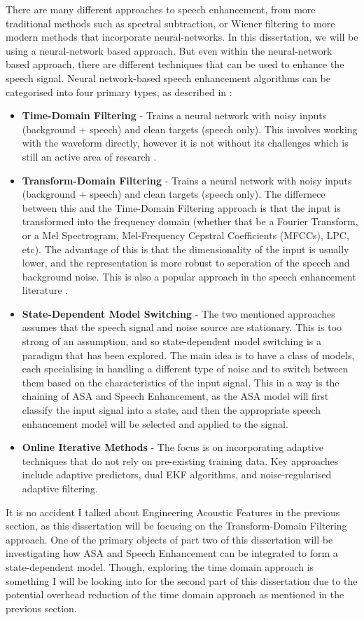 \documentclass[logo,bsc,singlespacing,parskip,online]{infthesis}
\begin{document}
There are many different approaches to speech enhancement, from more traditional methods such as spectral subtraction, or Wiener filtering
to more modern methods that incorporate neural-networks. In this dissertation, we will be using a neural-network based approach.
But even within the neural-network based approach, there are different techniques that can be used to enhance the speech signal. 
Neural network-based speech enhancement algorithms can be categorised into four primary types, as described in \cite{katagiri_handbook_2000}:
\begin{itemize}
   \item \textbf{Time-Domain Filtering} - Trains a neural network with noisy inputs (background + speech) and clean targets (speech only). 
   This involves working with the waveform directly, however it is not without its challenges which is still an active area of research \cite{saleem_time_2024}.
   \item \textbf{Transform-Domain Filtering} - Trains a neural network with noisy inputs (background + speech) and clean targets (speech only). 
   The differnece between this and the Time-Domain Filtering approach is that the input is transformed into the frequency domain 
   (whether that be a Fourier Transform, or a Mel Spectrogram, Mel-Frequency Cepstral Coefficients (MFCCs), LPC, etc). The advantage of this 
   is that the dimensionality of the input is usually lower, and the representation is more robust to seperation of the speech and background noise.
   This is also a popular approach in the speech enhancement literature \cite{hou_local_2023}.
   \item \textbf{State-Dependent Model Switching} - The two mentioned approaches assumes that the speech signal and noise source are stationary. 
   This is too strong of an assumption, and so state-dependent model switching is a paradigm that has been explored. The main idea is 
   to have a class of models, each specialising in handling a different type of noise and to switch between them based on the 
   characteristics of the input signal. This in a way is the chaining of ASA and Speech Enhancement, as the ASA model will 
   first classify the input signal into a state, and then the appropriate speech enhancement model will be selected and applied to the signal.
   \item \textbf{Online Iterative Methods} - The focus is on incorporating adaptive techniques that do not rely on pre-existing 
   training data. Key approaches include adaptive predictors, dual EKF algorithms, and noise-regularised adaptive filtering.
\end{itemize}
It is no accident I talked about Engineering Acoustic Features in the previous section, as this dissertation 
will be focusing on the Transform-Domain Filtering approach. One of the primary objects of part two of this dissertation will be 
investigating how ASA and Speech Enhancement can be integrated to form a state-dependent model.
Though, exploring the time domain approach is something I will be looking into for the second part of this dissertation 
due to the potential overhead reduction of the time domain approach as mentioned in the previous section.
\end{document}
